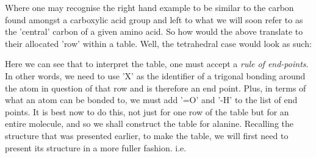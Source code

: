 \documentclass[a4paper,10pt]{article}
\begin{document}
Where one may recognise the right hand example to be similar to the carbon found amongst a carboxylic acid group and left to what we will soon refer to as the 'central' carbon of a given amino acid. So how would the above translate to their allocated 'row' within a table. Well, the tetrahedral case would look as such:

\begin{table}[h!]
\captionsetup{justification=centering}
\noindent{}
\caption{\small{Example of Tetrahedral Table Row}}
\label{tab:btetr}
\end{table}

\begin{table}[h!]
\captionsetup{justification=centering}
\noindent{}
\caption{\small{Example of Trigonal Table Row}}
\label{tab:btrir}
\end{table}

Here we can see that to interpret the table, one must accept a \textit{rule of end-points}. In other words, we need to use 'X' as the identifier of a trigonal bonding around the atom in question of that row and is therefore an end point. Plus, in terms of what an atom can be bonded to, we must add '=O' and '-H' to the list of end points. It is best now to do this, not just for one row of the table but for an entire molecule, and so we shall construct the table for alanine. Recalling the structure that was presented earlier, to make the table, we will first need to present its structure in a more fuller fashion. i.e.

\begin{center}
\footnotesize{
}
\end{center}

\begin{center}
 
\end{center}
\end{document}
